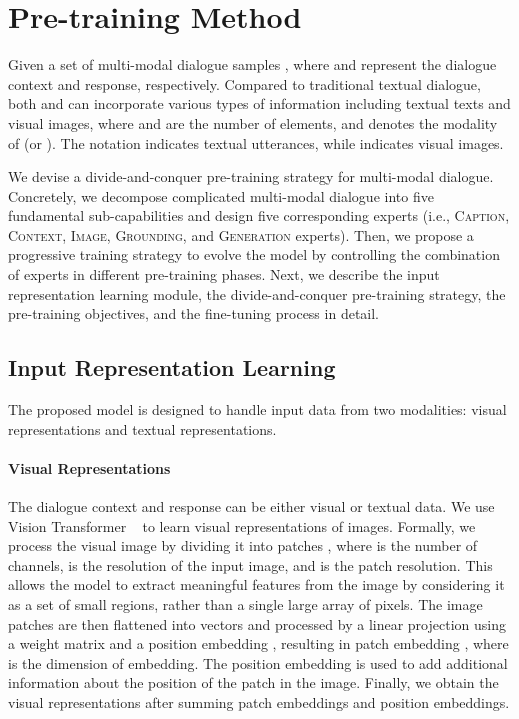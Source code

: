 \documentclass[11pt]{article}
\begin{document}
\section{Pre-training Method}
Given a set of  multi-modal dialogue samples , where  and  represent the dialogue context and response, respectively.
Compared to traditional textual dialogue, both  and  can incorporate various types of information including textual texts and visual images, where  and  are the number of elements, and  denotes the modality of   (or ). The notation  indicates textual utterances, while  indicates visual images.

We devise a divide-and-conquer pre-training strategy for multi-modal dialogue. Concretely, we decompose complicated multi-modal dialogue into five fundamental sub-capabilities and design five corresponding experts (i.e., \textsc{Caption}, \textsc{Context}, \textsc{Image}, \textsc{Grounding}, and \textsc{Generation} experts). Then, we propose a progressive training strategy to evolve the model by controlling the combination of experts in different pre-training phases. 
Next, we describe the input representation learning module, the divide-and-conquer pre-training strategy, the pre-training objectives, and the fine-tuning process in detail.


\subsection{Input Representation Learning}
The proposed model is designed to handle input data from two modalities: visual representations and textual representations. 


\paragraph{Visual Representations}
The dialogue context and response can be either visual or textual data. 
We use Vision Transformer ~\citep{dosovitskiy2020image} to learn visual representations of images. Formally, we process the visual image  by dividing it into  patches , where  is the number of channels,  is the resolution of the input image, and  is the patch resolution. This allows the model to extract meaningful features from the image by considering it as a set of small regions, rather than a single large array of pixels. The image patches are then flattened into vectors and processed by a linear projection using a weight matrix  and a position embedding , resulting in patch embedding , where  is the dimension of embedding. 
The position embedding is used to add additional information about the position of the patch in the image. 
Finally, we obtain the visual representations  after summing patch embeddings and position embeddings.
\end{document}
